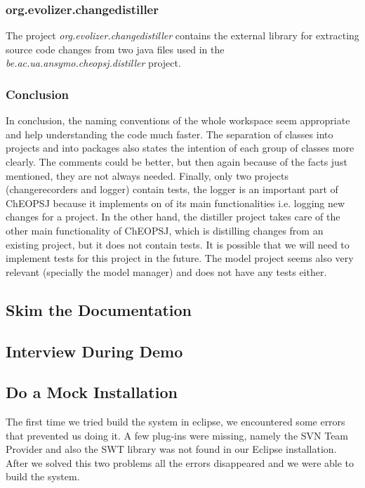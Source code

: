 \documentclass{article}
\begin{document}
\subsubsection{org.evolizer.changedistiller}
The project \emph{org.evolizer.changedistiller} contains the external library for extracting source code changes from two java files used in the \emph{be.ac.ua.ansymo.cheopsj.distiller} project.

\subsubsection{Conclusion}
In conclusion, the naming conventions of the whole workspace seem appropriate and help understanding the code much faster. The separation of classes into projects and into packages also states the intention of each group of classes more clearly. The comments could be better, but then again because of the facts just mentioned, they are not always needed. Finally, only two projects (changerecorders and logger) contain tests, the logger is an important part of ChEOPSJ because it implements on of its main functionalities i.e. logging new changes for a project. In the other hand, the distiller project takes care of the other main functionality of ChEOPSJ, which is distilling changes from an existing project, but it does not contain tests. It is possible that we will need to implement tests for this project in the future. The model project seems also very relevant (specially the model manager) and does not have any tests either.

\subsection{Skim the Documentation}


\subsection{Interview During Demo}

\subsection{Do a Mock Installation}
The first time we tried build the system in eclipse, we encountered some errors that prevented us doing it. A few plug-ins were missing, namely the SVN Team Provider and also the SWT library was not found in our Eclipse installation. After we solved this two problems all the errors disappeared and we were able to build the system. 
\end{document}
